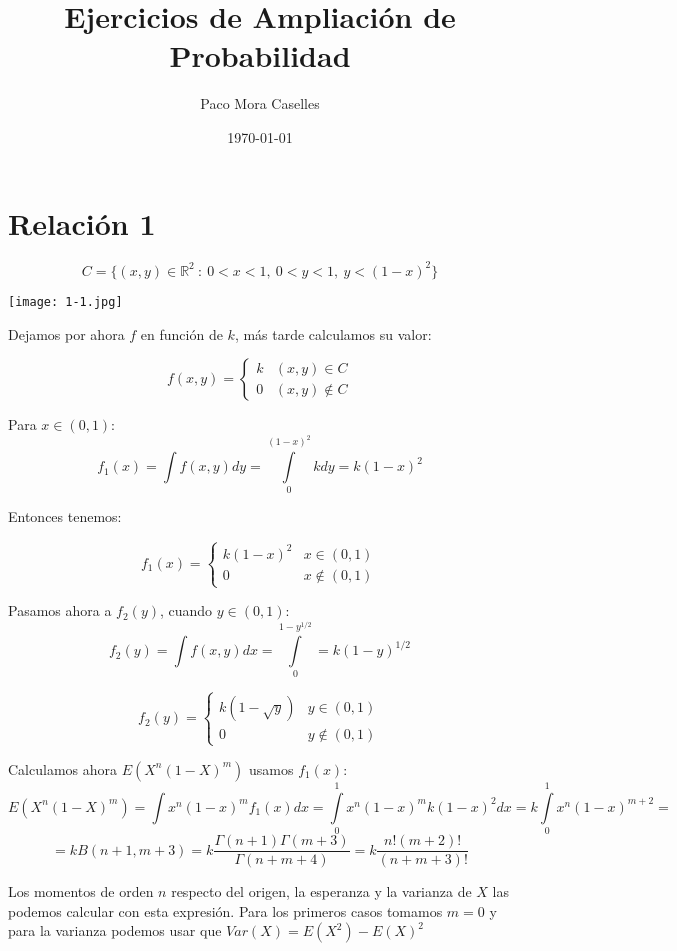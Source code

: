 \documentclass[openany]{book}
\title{Ejercicios de Ampliación de Probabilidad}
\author{Paco Mora Caselles}
\date{\today}
\begin{document}
\maketitle

\chapter{Relación 1}
\begin{exercise}
    $$  C = \{(x,y) \in \mathbb{R} ^2 \ :\ 0<x<1,\ 0<y<1,\ y < (1-x)^2\} $$

    \begin{center}
        \texttt{[image: 1-1.jpg]}
    \end{center}

    Dejamos por ahora $ f $ en función de $ k $, más tarde calculamos su valor:

    $$ f(x,y) = \left\{
    \begin{array}{lr}
        k & (x,y) \in C\\
        0 & (x,y) \not \in C   
    \end{array}
    \right. $$

    Para $ x \in (0,1) $:
    $$ f_{1}(x) = \int\limits_{}^{}f(x,y) dy = \int\limits_{0}^{(1-x)^2}k dy = k(1-x)^2 $$

    Entonces tenemos:

    $$ f_{1}(x) = \left\{
    \begin{array}{lr}
        k(1-x)^2 & x \in (0,1)\\
        0 & x \not \in (0,1)
    \end{array}
    \right. $$

    Pasamos ahora a $ f_{2}(y) $, cuando $ y \in (0,1) $:
    $$ f_{2}(y) = \int\limits_{}^{}f(x,y)dx = \int\limits_{0}^{1-y^{1/2}} = k (1-y)^{1/2} $$

    $$ f_{2}(y) = \left\{
    \begin{array}{lr}
        k(1-\sqrt{y}) & y \in (0,1) \\
        0 & y \not \in (0,1)
    \end{array}
    \right. $$

    Calculamos ahora $ E(X^{n}(1-X)^{m}) $ usamos $ f_{1}(x) $:
    $$ E(X^{n}(1-X)^{m}) = \int\limits_{}^{}x^{n}(1-x)^{m}f_{1}(x)dx = \int\limits_{0}^{1} x^{n}(1-x)^{m} k (1-x)^2 dx = k \int\limits_{0}^{1}x^{n}(1-x)^{m+2} =$$
    $$ =  kB(n+1,m+3) = k \dfrac{\Gamma(n+1)\Gamma(m+3)}{\Gamma(n+m+4)} = k \dfrac{n!(m+2)!}{(n+m+3)!} $$
    
    Los momentos de orden $ n $ respecto del origen, la esperanza y la varianza de $ X $ las podemos calcular con esta expresión. Para los primeros casos tomamos $ m=0 $ y para la varianza podemos usar que $ Var(X) = E(X^2)-E(X)^2 $


\end{exercise}
\end{document}
